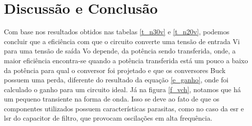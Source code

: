 \newpage
\section{Discussão e Conclusão}
Com base nos resultados obtidos nas tabelas \ref{t_n30v} e \ref{t_n20v}, podemos concluir que a eficiência com que o circuito converte uma tensão de entrada Vi para uma tensão de saída Vo depende, da potência sendo transferida, onde, a maior eficiência encontra-se quando a potência transferida está um pouco a baixo da potência para qual o conversor foi projetado e que os conversores Buck possuem uma perda, diferente do resultado da equação \ref{e_ganho}, onde foi calculado o ganho para um circuito ideal.
Já na figura \ref{f_vch}, notamos que há um pequeno transiente na forma de onda. Isso se deve ao fato de que os componentes utilizados possuem características parasitas, como no caso da esr e lsr do capacitor de filtro, que provocam oscilações em alta frequência.

